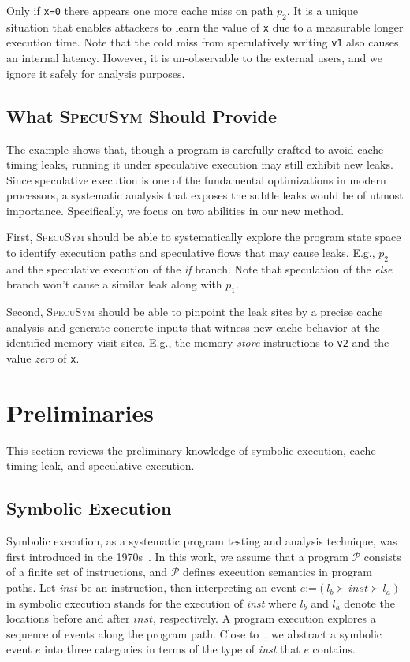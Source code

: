 \documentclass[sigconf]{acmart}
\newcommand{\SpecuSym}{\textsc{SpecuSym} }
\newcommand{\prog}{\mathcal{P}}
\begin{document}
Only if \texttt{x=0} there appears one more cache miss on path $p_2$. It is a 
unique situation that enables attackers to learn the value of \texttt{x} due to 
a measurable longer execution time. Note that the cold miss from speculatively 
writing \texttt{v1} also causes an internal latency. However, it is un-observable 
to the external users, and we ignore it safely for analysis purposes.


\subsection{What \SpecuSym Should Provide}
\label{sec:app-scenarios}

The example shows that, though a program is carefully crafted to avoid cache 
timing leaks, running it under speculative execution may still exhibit new 
leaks. Since speculative execution is one of the fundamental optimizations 
in modern processors, a systematic analysis that exposes the subtle leaks 
would be of utmost importance. Specifically, we focus on two abilities in 
our new method.


First, \SpecuSym should be able to systematically explore the program state 
space to identify execution paths and speculative flows that may cause leaks. 
E.g., $\mathit{p_2}$ and the speculative execution of the \textit{if} branch. 
Note that speculation of the \textit{else} branch won't cause a similar 
leak along with $\mathit{p_1}$.


Second, \SpecuSym should be able to pinpoint the leak sites by a precise cache 
analysis and generate concrete inputs that witness new cache behavior at the 
identified memory visit sites. E.g., the memory \textit{store} instructions to 
\texttt{v2} and the value \textit{zero} of \texttt{x}.


\section{Preliminaries}
\label{sec:prelim}

This section reviews the preliminary knowledge of symbolic execution, cache timing leak, 
and speculative execution.


\subsection{Symbolic Execution}
\label{sec:se}




Symbolic execution, as a systematic program testing and analysis technique, 
was first introduced in the 1970s~\cite{King76,Clarke76}. In this work, we 
assume that a program $\prog$ consists of a finite set of instructions, and 
$\prog$ defines execution semantics in program paths. Let \textit{inst} be 
an instruction, then interpreting an event $e$:=$(l_b\succ inst\succ l_a)$ 
in symbolic execution stands for the execution of \textit{inst} where $l_b$ 
and $l_a$ denote the locations before and after $inst$, respectively. A 
program execution explores a sequence of events along the program path. 
Close to~\cite{GuoKWYG15,GuoWW18}, we abstract a symbolic event $e$ into 
three categories in terms of the type of \textit{inst} that $e$ contains.
\end{document}
